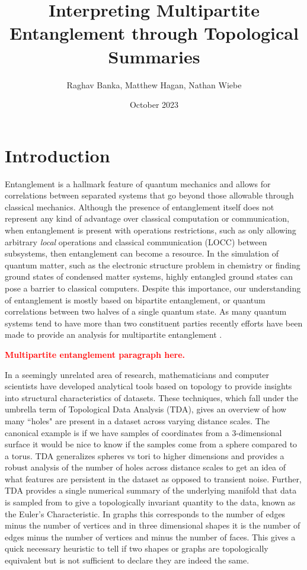 \documentclass{article}
\title{Interpreting Multipartite Entanglement through Topological Summaries}
\author{Raghav Banka, Matthew Hagan, Nathan Wiebe}
\date{October 2023}
\begin{document}
\maketitle

\section{Introduction}
Entanglement is a hallmark feature of quantum mechanics and allows for correlations between separated systems that go beyond those allowable through classical mechanics. Although the presence of entanglement itself does not represent any kind of advantage over classical computation or communication, when entanglement is present with operations restrictions, such as only allowing arbitrary \emph{local} operations and classical communication (LOCC) between subsystems, then entanglement can become a resource. In the simulation of quantum matter, such as the electronic structure problem in chemistry or finding ground states of condensed matter systems, highly entangled ground states can pose a barrier to classical computers. Despite this importance, our understanding of entanglement is mostly based on bipartite entanglement, or quantum correlations between two halves of a single quantum state. As many quantum systems tend to have more than two constituent parties recently efforts have been made to provide an analysis for multipartite entanglement \cite{horodecki2024multipartiteentanglement}. 

\textcolor{red}{\textbf{Multipartite entanglement paragraph here.}}

In a seemingly unrelated area of research, mathematicians and computer scientists have developed analytical tools based on topology to provide insights into structural characteristics of datasets. These techniques, which fall under the umbrella term of Topological Data Analysis (TDA), gives an overview of how many ``holes" are present in a dataset across varying distance scales. The canonical example is if we have samples of coordinates from a 3-dimensional surface it would be nice to know if the samples come from a sphere compared to a torus. TDA generalizes spheres vs tori to higher dimensions and provides a robust analysis of the number of holes across distance scales to get an idea of what features are persistent in the dataset as opposed to transient noise. Further, TDA provides a single numerical summary of the underlying manifold that data is sampled from to give a topologically invariant quantity to the data, known as the Euler's Characteristic. In graphs this corresponds to the number of edges minus the number of vertices and in three dimensional shapes it is the number of edges minus the number of vertices and minus the number of faces. This gives a quick necessary heuristic to tell if two shapes or graphs are topologically equivalent but is not sufficient to declare they are indeed the same. 
\end{document}
